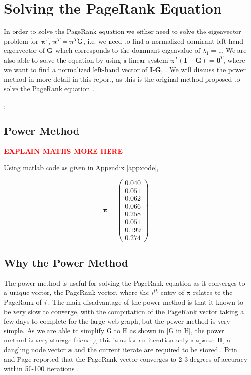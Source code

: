 \documentclass[11pt]{report}
\begin{document}
\section{Solving the PageRank Equation}
In order to solve the PageRank equation we either need to solve the eigenvector problem for $\boldsymbol{\pi}^T$, \(\boldsymbol{\pi}^T = \boldsymbol{\pi}^T\textbf{G}\), i.e. we need to find a normalized dominant left-hand eigenvector of \textbf{G} which corresponds to the dominant eigenvalue of $\lambda_1 = 1$. We are also able to solve the equation by using a linear system \(\boldsymbol{\pi}^T(\textbf{I}-\textbf{G})=\textbf{0}^T\), where we want to find a normalized left-hand vector of \textbf{I}-\textbf{G}, \cite{langville}. We will discuss the power method in more detail in this report, as this is the original method proposed to solve the PageRank equation \cite{langville}.


\cite{ipsen2005analysis}, \cite{page1999pagerank}
\subsection{Power Method}

\textcolor{red}{\textbf{EXPLAIN MATHS MORE HERE}}

Using matlab code as given in Appendix \ref{app:code}, 

\[\boldsymbol\pi = \left(
\begin{array}{c}
0.040 \\
0.051 \\
0.062 \\
0.066 \\
0.258 \\
0.051 \\
0.199 \\
0.274
\end{array}
\right)\]

\subsection{Why the Power Method}

The power method is useful for solving the PageRank equation as it converges to a unique vector, the PageRank vector, where the $i^{th}$ entry of $\boldsymbol\pi$ relates to the PageRank of \textit{i} \cite{ipsen2005analysis}. The main disadvantage of the power method is that it known to be very slow to converge, with the computation of the PageRank vector taking a few days to complete for the large web graph, but the power method is very simple. As we are able to simplify G to H as shown in \eqref{G in H}, the power method is very storage friendly, this is as for an iteration only a sparse \textbf{H}, a dangling node vector \textbf{a} and the current iterate are required to be stored \cite{langville}. Brin and Page reported that the PageRank vector converges to 2-3 degrees of accuracy within 50-100 iterations \cite{austin}.
\end{document}
